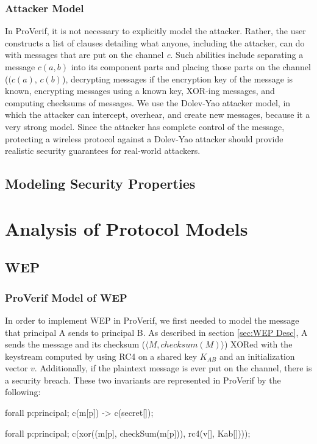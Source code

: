 \documentclass[11pt, twocolumn]{article} %
\begin{document}
{\subsubsection{Attacker Model}
In ProVerif, it is not necessary to explicitly model the attacker.  Rather, the user constructs a list of clauses detailing what anyone, including the attacker, can do with messages that are put on the channel \textit{c}.  Such abilities include separating a message $c(a,b)$ into its component parts and placing those parts on the channel ($(c(a)$, $c(b)$), decrypting messages if the encryption key of the message is known, encrypting messages using a known key, XOR-ing messages, and computing checksums of messages.  We use the Dolev-Yao attacker model, in which the attacker can intercept, overhear, and create new messages, because it a very strong model.  Since the attacker has complete control of the message, protecting a wireless protocol against a Dolev-Yao attacker should provide realistic security guarantees for real-world attackers. 

\subsection{Modeling Security Properties}

\section{Analysis of Protocol Models}
\label{sec:analysis}
\subsection{WEP}
\subsubsection{ProVerif Model of WEP}
In order to implement WEP in ProVerif, we first needed to model the message that principal A sends to principal B.  As described in section \ref{sec:WEP Desc}, A sends the message and its checksum ($\langle M, checksum(M)\rangle$) XORed with the keystream computed by using RC4 on a shared key $K_{AB}$ and an initialization vector $v$.  Additionally, if the plaintext message is ever put on the channel, there is a security breach.  These two invariants are represented in ProVerif by the following:
\begin{verbatimtab}[4]
forall p:principal; c(m[p]) -> c(secret[]);

forall p:principal; 
	c(xor((m[p], checkSum(m[p])), 
		rc4(v[], Kab[])));
\end{verbatimtab}


}
\end{document}
